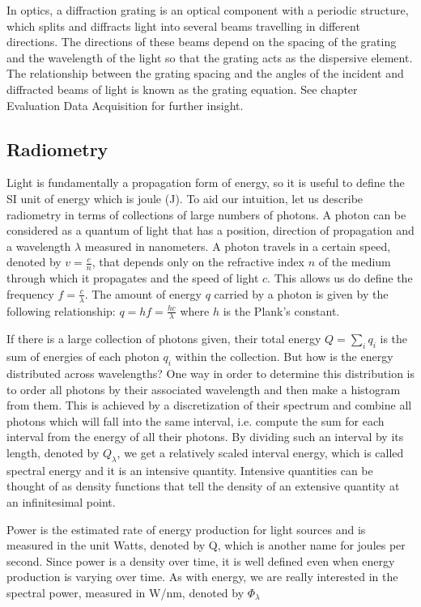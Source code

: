 In optics, a diffraction grating is an optical component with a periodic structure, which splits and diffracts light into several beams travelling in different directions. The directions of these beams depend on the spacing of the grating and the wavelength of the light so that the grating acts as the dispersive element.
The relationship between the grating spacing and the angles of the incident and diffracted beams of light is known as the grating equation. See chapter Evaluation Data Acquisition for further insight.

\subsection{Radiometry}
Light is fundamentally a propagation form of energy, so it is useful to define the SI unit of energy which is joule (J). To aid our intuition, let us describe radiometry in terms of collections of large numbers of photons. A photon can be considered as a quantum of light that has a position, direction of propagation and a wavelength $\lambda$ measured in nanometers. A photon travels in a certain speed, denoted by $v = \frac{c}{n}$, that depends only on the refractive index $n$ of the medium through which it propagates and the speed of light $c$. This allows us do define the frequency $f = \frac{c}{\lambda}$. The amount of energy $q$ carried by a photon is given by the following relationship: $q = hf= \frac{hc}{\lambda}$ where $h$ is the Plank's constant.

If there is a large collection of photons given, their total energy $Q = \sum_i q_i$ is the sum of energies of each photon $q_i$ within the collection. But how is the energy distributed across wavelengths? One way in order to determine this distribution is to order all photons by their associated wavelength and then make a histogram from them. This is achieved by a discretization of their spectrum and combine all photons which will fall into the same interval, i.e. compute the sum for each interval from the energy of all their photons. By dividing such an interval by its length, denoted by $Q_\lambda$, we get a relatively scaled interval energy, which is called spectral energy and it is an intensive quantity. Intensive quantities can be thought of as density functions that tell the density of an extensive quantity at an infinitesimal point.

Power is the estimated rate of energy production for light sources and is measured in the unit Watts, denoted by Q, which is another name for joules per second. Since power is a density over time, it is well defined even when energy production is varying over time. As with energy, we are really interested in the spectral power, measured in W/nm, denoted by $\Phi_\lambda$

